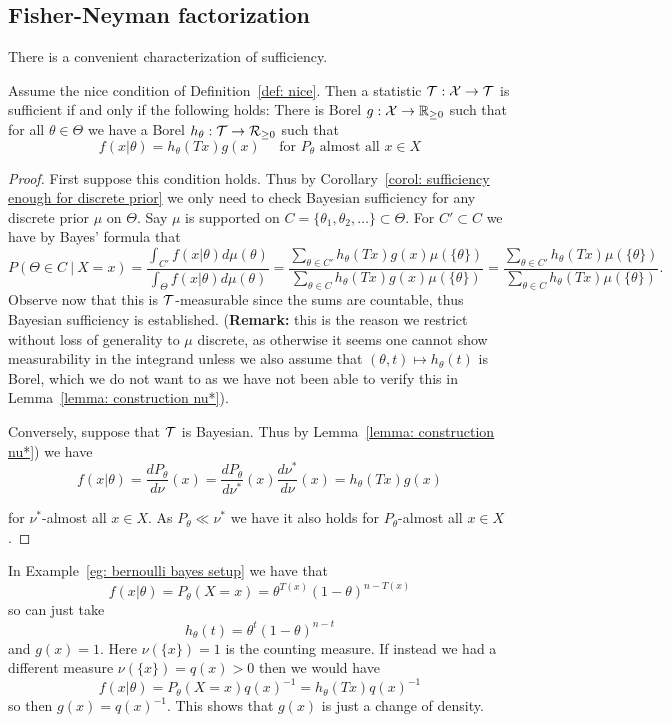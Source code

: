 \documentclass[twoside, a4paper, 10pt]{amsart}
\begin{document}
\subsection{Fisher-Neyman factorization}

There is a convenient characterization of sufficiency.

\begin{thm} Assume the nice condition of Definition~\ref{def: nice}. Then a statistic $\mathcal{T}:\mathcal{X} \to \mathcal{T}$ is sufficient if and only if the following holds: There is Borel $g:\mathcal{X} \to \mathbb{R}_{\geq 0}$ such that for all $\theta \in \Theta$ we have a Borel $h_{\theta}:\mathcal{T} \to \mathcal{R}_{\geq 0}$ such that $$f(x|\theta) = h_{\theta}(Tx) g(x) \quad\text{ for $P_{\theta}$ almost all $x \in X$} $$

\end{thm}

\begin{proof} First suppose this condition holds. Thus by Corollary~\ref{corol: sufficiency enough for discrete prior} we only need to check Bayesian sufficiency for any discrete prior $\mu$ on $\Theta$. Say $\mu$ is supported on $C = \{\theta_1, \theta_2,\ldots \} \subset \Theta$. For $C' \subset C$ we have by Bayes' formula that $$P(\Theta \in C ~|~ X=x) = \frac{\int_{C'} f(x|\theta) d\mu(\theta) }{\int_{\Theta} f(x|\theta) d\mu(\theta) }  = \frac{\sum_{\theta \in C'} h_{\theta}(Tx)g(x) \mu(\{\theta\})}{\sum_{\theta \in C} h_{\theta}(Tx)g(x) \mu(\{\theta\})} = \frac{\sum_{\theta \in C'} h_{\theta}(Tx) \mu(\{\theta\})}{\sum_{\theta \in C} h_{\theta}(Tx) \mu(\{\theta\})}. $$ Observe now that this is $\mathcal{T}$-measurable since the sums are countable, thus Bayesian sufficiency is established. (\textbf{Remark:} this is the reason we restrict without loss of generality to $\mu$ discrete, as otherwise it seems one cannot show measurability in the integrand unless we also assume that $(\theta, t) \mapsto h_{\theta}(t)$ is Borel, which we do not want to as we have not been able to verify this in Lemma~\ref{lemma: construction nu*}).

Conversely, suppose that $\mathcal{T}$ is Bayesian. Thus by Lemma~\ref{lemma: construction nu*}) we have $$f(x|\theta) = \frac{dP_{\theta}}{d\nu}(x) = \frac{dP_{\theta}}{d\nu^*}(x) \frac{d\nu^*}{d\nu}(x) = h_{\theta}(Tx) g(x)$$

for $\nu^*$-almost all $x \in X$. As $P_{\theta} \ll \nu^*$ we have it also holds for $P_{\theta}$-almost all $x \in X$. \end{proof}

\begin{eg} In Example~\ref{eg: bernoulli bayes setup} we have that $$f(x|\theta) = P_{\theta}(X = x) =   \theta^{T(x)}(1-\theta)^{n - T(x)} $$ so can just take $$h_{\theta}(t) = \theta^t(1-\theta)^{n-t}$$ and $g(x)=1$. Here $\nu(\{x\})=1$ is the counting measure. If instead we had a different measure $\nu(\{x\})=q(x)>0$ then we would have $$f(x|\theta) =  P_{\theta}(X = x) q(x)^{-1} = h_{\theta}(Tx) q(x)^{-1} $$ so then $g(x) = q(x)^{-1}$. This shows that $g(x)$ is just a change of density.

\end{eg}
\end{document}
